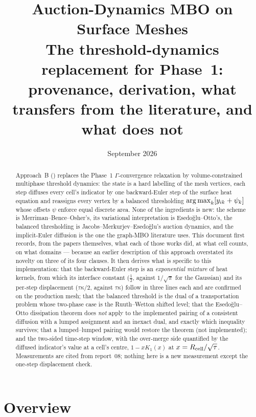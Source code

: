 \documentclass[11pt,a4paper]{article}
\title{\textbf{Auction-Dynamics MBO on Surface Meshes}\\[0.5em]
  \large The threshold-dynamics replacement for Phase~1: provenance, derivation,
  what transfers from the literature, and what does not}
\author{}
\date{September 2026}
\begin{document}
\maketitle

\begin{abstract}
Approach~B () replaces the Phase~1
$\Gamma$-convergence relaxation by volume-constrained multiphase threshold
dynamics: the state is a hard labelling of the mesh vertices, each step diffuses
every cell's indicator by one backward-Euler step of the surface heat equation and
reassigns every vertex by a balanced thresholding $\operatorname*{arg\,max}_k [y_{ik} + \psi_k]$
whose offsets $\psi$ enforce equal discrete area. None of the ingredients is new:
the scheme is Merriman--Bence--Osher's, its variational interpretation is
Esedo\u{g}lu--Otto's, the balanced thresholding is Jacobs--Merkurjev--Esedo\u{g}lu's
auction dynamics, and the implicit-Euler diffusion is the one the graph-MBO
literature uses. This document first records, from the papers themselves, what
each of those works did, at what cell counts, on what domains --- because an
earlier description of this approach overstated its novelty on three of its
four clauses. It then derives what is specific to this implementation: that the
backward-Euler step is an \emph{exponential mixture} of heat kernels, from which
its interface constant ($\tfrac12$, against $1/\sqrt\pi$ for the Gaussian) and its
per-step displacement ($\tau\kappa/2$, against $\tau\kappa$) follow in three
lines each and are confirmed on the production mesh; that the balanced
threshold is the dual of a transportation problem whose two-phase case is the
Ruuth--Wetton shifted level; that the Esedo\u{g}lu--Otto dissipation theorem does
\emph{not} apply to the implemented pairing of a consistent diffusion with a
lumped assignment and an inexact dual, and exactly which inequality survives;
that a lumped--lumped pairing would restore the theorem (not implemented); and
the two-sided time-step window, with the over-merge side quantified by the
diffused indicator's value at a cell's centre, $1 - x K_1(x)$ at
$x = R_{\mathrm{cell}}/\sqrt\tau$. Measurements are cited from report~08; nothing here is a
new measurement except the one-step displacement check.
\end{abstract}

\tableofcontents
\newpage

\section{Overview}
\label{sec:overview}
\end{document}
